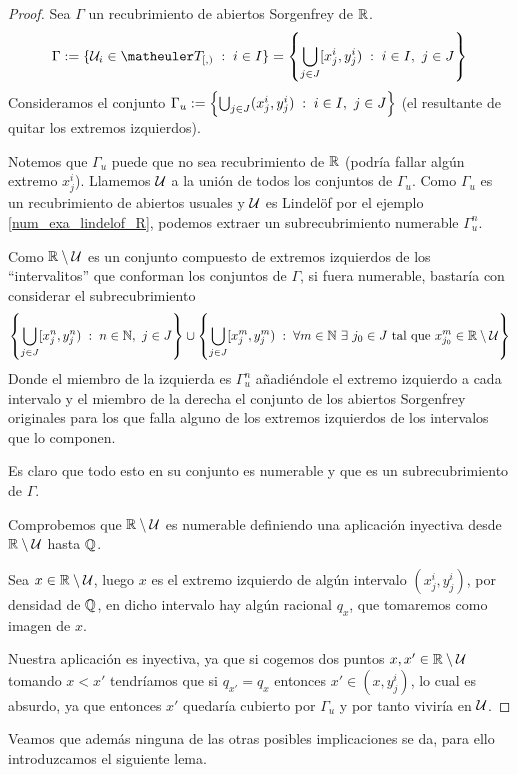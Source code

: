 \begin{proof}
	Sea $\Gamma$ un recubrimiento de abiertos Sorgenfrey de $\mathbb{R}$.
	\begin{equation*}
		\Gamma:=\{\U_i\in\T_{[,)}\midc i\in I\}=\left\{\bigcup_{j\in J}[x_j^i,y_j^i)\midc i\in I,\ j\in J\right\}
	\end{equation*}
	Consideramos el conjunto $\Gamma_u:=\left\{\bigcup_{j\in J}(x_j^i,y_j^i)\;:\; i\in I,\ j\in J\right\}$ (el resultante de quitar los extremos izquierdos).
	
	Notemos que $\Gamma_u$ puede que no sea recubrimiento de $\mathbb{R}$ (podría fallar algún extremo $x_j^i$). Llamemos $\mathcal{U}$ a la unión de todos los conjuntos de $\Gamma_u$. Como $\Gamma_u$ es un recubrimiento de abiertos usuales y $\mathcal{U}$ es Lindelöf por el ejemplo \ref{num_exa_lindelof_R}, podemos extraer un subrecubrimiento numerable $\Gamma_u^n$.
	
	Como $\mathbb{R}\setminus \mathcal{U}$ es un conjunto compuesto de extremos izquierdos de los ``intervalitos'' que conforman los conjuntos de $\Gamma$, si fuera numerable, bastaría con considerar el subrecubrimiento 
	\begin{equation*}
		\left\{\bigcup_{j\in J}[x_j^n,y_j^n)\;:\; n\in \mathbb{N},\ j\in J\right\}\cup\left\{\bigcup_{j\in J}[x_j^m,y_j^m)\;:\; \forall m\in\mathbb{N}\ \exists\ j_0\in J\text{ tal que } x_{j_0}^m\in\mathbb{R}\setminus\mathcal{U}\right\}
	\end{equation*}
	Donde el miembro de la izquierda es $\Gamma_u^n$ añadiéndole el extremo izquierdo a cada intervalo y el miembro de la derecha el conjunto de los abiertos Sorgenfrey originales para los que falla alguno de los extremos izquierdos de los intervalos que lo componen.
	
	Es claro que todo esto en su conjunto es numerable y que es un subrecubrimiento de $\Gamma$.
	
	Comprobemos que $\mathbb{R}\setminus\mathcal{U}$ es numerable definiendo una aplicación inyectiva desde $\mathbb{R}\setminus\mathcal{U}$ hasta $\mathbb{Q}$.
	
	Sea $x\in\mathbb{R}\setminus\mathcal{U}$, luego $x$ es el extremo izquierdo de algún intervalo $(x_j^i, y_j^i)$, por densidad de $\mathbb{Q}$, en dicho intervalo hay algún racional $q_x$, que tomaremos como imagen de $x$.
	
	Nuestra aplicación es inyectiva, ya que si cogemos dos puntos $x,x'\in\mathbb{R}\setminus\mathcal{U}$ tomando $x<x'$ tendríamos que si $q_{x'}=q_x$ entonces $x'\in(x,y_j^i)$, lo cual es absurdo, ya que entonces $x'$ quedaría cubierto por $\Gamma_u$ y por tanto viviría en $\mathcal{U}$.
\end{proof}
Veamos que además ninguna de las otras posibles implicaciones se da, para ello introduzcamos el siguiente lema.
